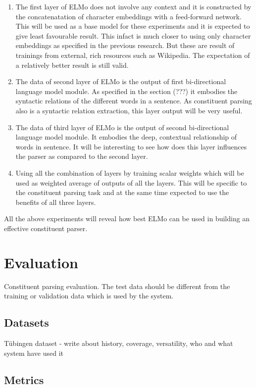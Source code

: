 \documentclass[a4paper, 11pt]{article}
\begin{document}
\begin{enumerate}
\item The first layer of ELMo does not involve any context and it is constructed by the concatenatation of character embeddings with a feed-forward network. This will be used as a base model for these experiments and it is expected to give least favourable result. This infact is much closer to using only character embeddings as specified in the previous research. But these are result of trainings from external, rich resources such as Wikipedia. The expectation of a relatively better result is still valid.
\item The data of second layer of ELMo is the output of first bi-directional language model module. As specified in the section (???) it embodies the syntactic relations of the different words in a sentence. As constituent parsing also is a syntactic relation extraction, this layer output will be very useful. 
\item The data of third layer of ELMo is the output of second bi-directional language model module. It embodies the deep, contextual relationship of words in sentence. It will be interesting to see how does this layer influences the parser as compared to the second layer.   
\item Using all the combination of layers by training scalar weights which will be used as weighted average of outputs of all the layers. This will be specific to the constituent parsing task and at the same time expected to use the benefits of all three layers. 
\end{enumerate}

All the above experiments will reveal how best ELMo can be used in building an effective constituent parser. 

\pagebreak
\section{Evaluation}

Constituent parsing evaluation. The test data should be different from the training or validation data which is used by the system. 

\subsection{Datasets}

Tübingen dataset - write about history, coverage, versatility, who and what system have used it 


\subsection{Metrics}
\end{document}

